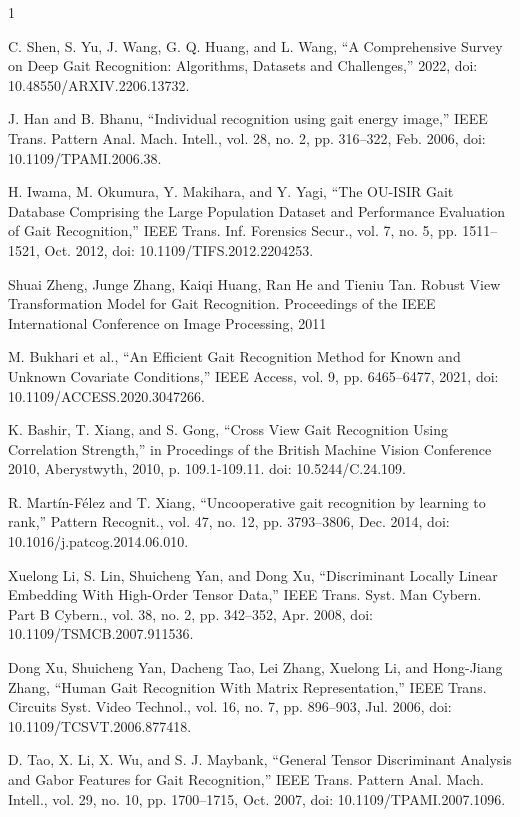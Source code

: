 \documentclass[A4paper,12pt]{report}
\theoremstyle{plain}
\theoremstyle{definition}
\theoremstyle{remark}
\numberwithin{equation}{section}
\renewenvironment{thebibliography}[1]{
  \begin{oldthebibliography}{#1}
    \setlength{\itemsep}{0em}
}
{
  \end{oldthebibliography}
}
\begin{document}
\begin{thebibliography}{1}
\vspace{-6cm}
 C. Shen, S. Yu, J. Wang, G. Q. Huang, and L. Wang, “A Comprehensive Survey on Deep Gait Recognition: Algorithms, Datasets and Challenges,” 2022, doi: 10.48550/ARXIV.2206.13732. 

 J. Han and B. Bhanu, “Individual recognition using gait energy image,” IEEE Trans. Pattern Anal. Mach. Intell., vol. 28, no. 2, pp. 316–322, Feb. 2006, doi: 10.1109/TPAMI.2006.38. 

 H. Iwama, M. Okumura, Y. Makihara, and Y. Yagi, “The OU-ISIR Gait Database Comprising the Large Population Dataset and Performance Evaluation of Gait Recognition,” IEEE Trans. Inf. Forensics Secur., vol. 7, no. 5, pp. 1511–1521, Oct. 2012, doi: 10.1109/TIFS.2012.2204253. 

  Shuai Zheng, Junge Zhang, Kaiqi Huang, Ran He and Tieniu Tan. Robust View Transformation Model for Gait Recognition. Proceedings of the IEEE International Conference on Image Processing, 2011

 M. Bukhari et al., “An Efficient Gait Recognition Method for Known and Unknown Covariate Conditions,” IEEE Access, vol. 9, pp. 6465–6477, 2021, doi: 10.1109/ACCESS.2020.3047266. 

 K. Bashir, T. Xiang, and S. Gong, “Cross View Gait Recognition Using Correlation Strength,” in Procedings of the British Machine Vision Conference 2010, Aberystwyth, 2010, p. 109.1-109.11. doi: 10.5244/C.24.109. 

 R. Martín-Félez and T. Xiang, “Uncooperative gait recognition by learning to rank,” Pattern Recognit., vol. 47, no. 12, pp. 3793–3806, Dec. 2014, doi: 10.1016/j.patcog.2014.06.010. 

 Xuelong Li, S. Lin, Shuicheng Yan, and Dong Xu, “Discriminant Locally Linear Embedding With High-Order Tensor Data,” IEEE Trans. Syst. Man Cybern. Part B Cybern., vol. 38, no. 2, pp. 342–352, Apr. 2008, doi: 10.1109/TSMCB.2007.911536. 

 Dong Xu, Shuicheng Yan, Dacheng Tao, Lei Zhang, Xuelong Li, and Hong-Jiang Zhang, “Human Gait Recognition With Matrix Representation,” IEEE Trans. Circuits Syst. Video Technol., vol. 16, no. 7, pp. 896–903, Jul. 2006, doi: 10.1109/TCSVT.2006.877418. 

 D. Tao, X. Li, X. Wu, and S. J. Maybank, “General Tensor Discriminant Analysis and Gabor Features for Gait Recognition,” IEEE Trans. Pattern Anal. Mach. Intell., vol. 29, no. 10, pp. 1700–1715, Oct. 2007, doi: 10.1109/TPAMI.2007.1096. 


\end{thebibliography}
\end{document}
